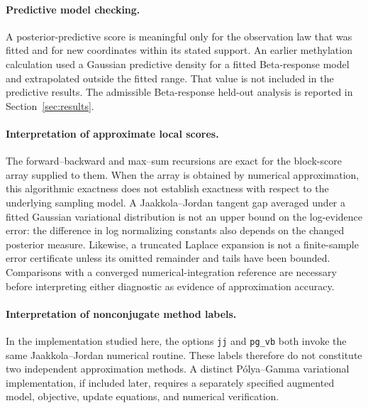 \paragraph{Predictive model checking.}
A posterior-predictive score is meaningful only for the observation law that
was fitted and for new coordinates within its stated support. An earlier
methylation calculation used a Gaussian predictive density for a fitted
Beta-response model and extrapolated outside the fitted range. That value is
not included in the predictive results. The admissible Beta-response
held-out analysis is reported in Section~\ref{sec:results}.

\paragraph{Interpretation of approximate local scores.}
The forward--backward and max--sum recursions are exact for the block-score array supplied to them. When the array is obtained by numerical approximation, this algorithmic exactness does not establish exactness with respect to the underlying sampling model. A Jaakkola--Jordan tangent gap averaged under a fitted Gaussian variational distribution is not an upper bound on the log-evidence error: the difference in log normalizing constants also depends on the changed posterior measure. Likewise, a truncated Laplace expansion is not a finite-sample error certificate unless its omitted remainder and tails have been bounded. Comparisons with a converged numerical-integration reference are necessary before interpreting either diagnostic as evidence of approximation accuracy.
\paragraph{Interpretation of nonconjugate method labels.}
In the implementation studied here, the options \texttt{jj} and \texttt{pg\_vb} both invoke the same Jaakkola--Jordan numerical routine. These labels therefore do not constitute two independent approximation methods. A distinct P\'olya--Gamma variational implementation, if included later, requires a separately specified augmented model, objective, update equations, and numerical verification.
